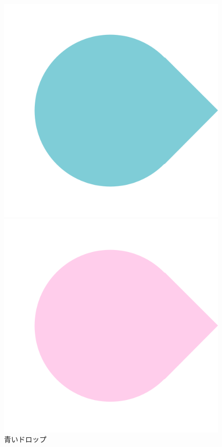 \documentclass[a4]{jsarticle}
\begin{document}
\begin{figure}[htbp]
	\begin{minipage}[t]{0.3\hsize}
		\begin{center}
			\includegraphics[scale=0.2]{../imgs2/drop_blue.png}
			\caption{青いドロップ}
			\label{fig:blue_drop}
		\end{center}
	\end{minipage}
	\begin{minipage}[t]{0.3\hsize}
		\begin{center}
			\includegraphics[scale=0.2]{../imgs2/drop_pink.png}

\end{center}
\end{minipage}
\end{figure}
\end{document}
